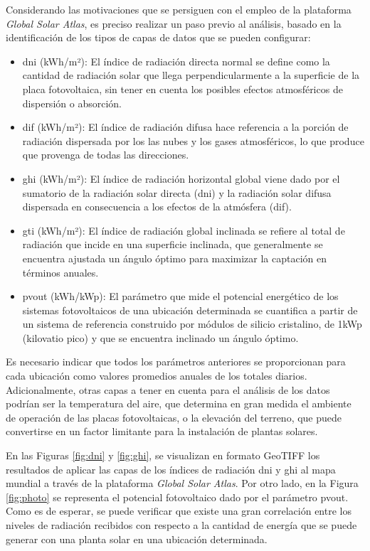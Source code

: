 Considerando las motivaciones que se persiguen con el empleo de la plataforma \textit{Global Solar Atlas}, es preciso realizar un paso previo al análisis, basado en la identificación de los tipos de capas de datos que se pueden configurar: \cite{globalsolarreport}

\begin{itemize}    
    \item \gls{dni} (kWh/m²): El índice de radiación directa normal se define como la cantidad de radiación solar que llega perpendicularmente a la superficie de la placa fotovoltaica, sin tener en cuenta los posibles efectos atmosféricos de dispersión o absorción.
    \item \gls{dif} (kWh/m²): El índice de radiación difusa hace referencia a la porción de radiación dispersada por los las nubes y los gases atmosféricos, lo que produce que provenga de todas las direcciones.
    \item \gls{ghi} (kWh/m²): El índice de radiación horizontal global viene dado por el sumatorio de la radiación solar directa (\gls{dni}) y la radiación solar difusa dispersada en consecuencia a los efectos de la atmósfera (\gls{dif}).
    \item \gls{gti} (kWh/m²): El índice de radiación global inclinada se refiere al total de radiación que incide en una superficie inclinada, que generalmente se encuentra ajustada un ángulo óptimo para maximizar la captación en términos anuales. 
    \item \gls{pvout} (kWh/kWp): El parámetro que mide el potencial energético de los sistemas fotovoltaicos de una ubicación determinada se cuantifica a partir de un sistema de referencia construido por módulos de silicio cristalino, de 1kWp (kilovatio pico) y que se encuentra inclinado un ángulo óptimo.
\end{itemize}

Es necesario indicar que todos los parámetros anteriores se proporcionan para cada ubicación como valores promedios anuales de los totales diarios. Adicionalmente, otras capas a tener en cuenta para el análisis de los datos podrían ser la temperatura del aire, que determina en gran medida el ambiente de operación de las placas fotovoltaicas, o la elevación del terreno, que puede convertirse en un factor limitante para la instalación de plantas solares. 

\vspace{3mm}

En las Figuras \ref{fig:dni} y \ref{fig:ghi}, se visualizan en formato GeoTIFF los resultados de aplicar las capas de los índices de radiación \gls{dni} y \gls{ghi} al mapa mundial a través de la plataforma \textit{Global Solar Atlas}. Por otro lado, en la Figura \ref{fig:photo} se representa el potencial fotovoltaico dado por el parámetro \gls{pvout}. Como es de esperar, se puede verificar que existe una gran correlación entre los niveles de radiación recibidos con respecto a la cantidad de energía que se puede generar con una planta solar en una ubicación determinada. 

